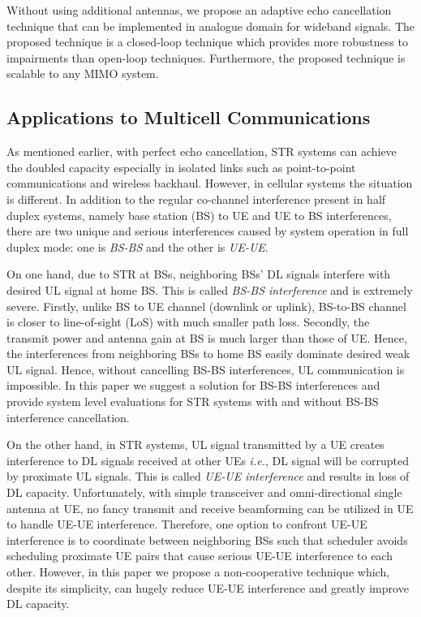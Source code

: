 \documentclass[twocolumn]{IEEEtran}
\begin{document}
Without using additional antennas, we propose an adaptive echo
cancellation technique that can be implemented in analogue domain
for wideband signals. The proposed technique is a closed-loop
technique which provides more robustness to impairments than
open-loop techniques. Furthermore, the proposed technique is
scalable to any MIMO system.


\subsection{Applications to Multicell Communications}

As mentioned earlier, with perfect echo cancellation, STR systems
can achieve the doubled capacity especially in isolated links such
as point-to-point communications and wireless backhaul. However, in
cellular systems the situation is different. In addition to the
regular co-channel interference present in half duplex systems,
namely base station (BS) to UE and UE to BS interferences, there are
two unique and serious interferences caused by system operation in
full duplex mode: one is \emph{BS-BS} and the other is \emph{UE-UE}.

On one hand, due to STR at BSs, neighboring BSs' DL signals
interfere with desired UL signal at home BS. This is called
\emph{BS-BS interference} and is extremely severe. Firstly, unlike
BS to UE channel (downlink or uplink), BS-to-BS channel is closer to
line-of-sight (LoS) with much smaller path loss. Secondly, the
transmit power and antenna gain at BS is much larger than those of
UE. Hence, the interferences from neighboring BSs to home BS easily
dominate desired weak UL signal. Hence, without cancelling BS-BS
interferences, UL communication is impossible. In this paper we
suggest a solution for BS-BS interferences and provide system level
evaluations for STR systems with and without BS-BS interference
cancellation.

On the other hand, in STR systems, UL signal transmitted by a UE
creates interference to DL signals received at other UEs
\textit{i.e.}, DL signal will be corrupted by proximate UL signals.
This is called \emph{UE-UE interference} and results in loss of DL
capacity. Unfortunately, with simple transceiver and
omni-directional single antenna at UE, no fancy transmit and receive
beamforming can be utilized in UE to handle UE-UE interference.
Therefore, one option to confront UE-UE interference is to
coordinate between neighboring BSs such that scheduler avoids
scheduling proximate UE pairs that cause serious UE-UE interference
to each other. However, in this paper we propose a non-cooperative
technique which, despite its simplicity, can hugely reduce UE-UE
interference and greatly improve DL capacity.
\end{document}

